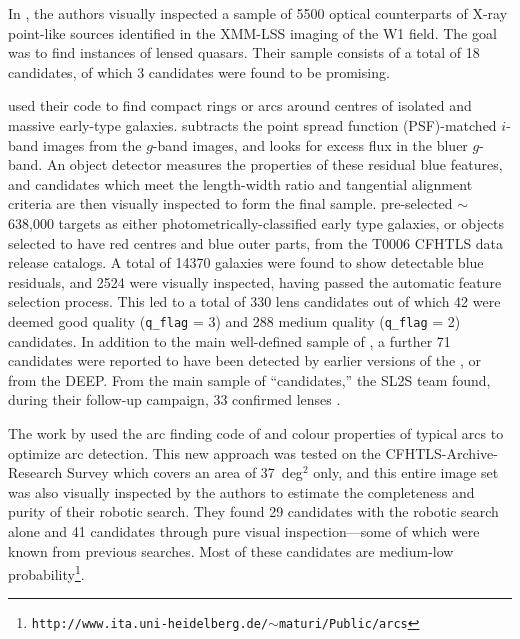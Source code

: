 \documentclass[useAMS,usenatbib,a4paper]{mn2e}
\begin{document}
In \citet{Elyiv2013}, the authors visually inspected a sample of 5500 optical
counterparts of X-ray point-like sources identified in the XMM-LSS
imaging of the \cfhtls W1 field. The goal was to find instances
of lensed quasars. Their sample consists of a total of 18 candidates,
of which 3 candidates were found to be promising.

\citet{Gavazzi2014} used their \rf code to find compact rings or arcs
around centres of isolated and massive early-type galaxies. \rf
subtracts the point spread function (PSF)-matched $i$-band images from the $g$-band images, and
looks for excess flux in the bluer $g$-band. An object detector measures
the properties of these residual blue features, and candidates which
meet the length-width ratio and tangential alignment criteria are then
visually inspected to form the final sample. \citet{Gavazzi2014}
pre-selected $\sim$638,000 targets as either photometrically-classified
early type galaxies, or objects selected to have red centres and blue
outer parts, from the T0006 CFHTLS data release catalogs. A total of
14370 galaxies were found to show detectable blue residuals, and 2524
were visually inspected, having passed the automatic feature selection
process. This led to a total of 330 lens candidates out of which 42 were deemed
good quality (\texttt{q\_flag} = 3) and 288  medium quality
(\texttt{q\_flag} = 2) candidates. In addition to the main well-defined
sample of \citet{Gavazzi2014}, a further 71 candidates were reported to
have been detected by earlier versions of the \rf, or from the \cfhtls DEEP.
From the main sample of ``\rf candidates,'' the SL2S team found, during
their follow-up campaign, 33 confirmed lenses \citep{Sonnenfeld2013a,Sonnenfeld2013b}.

The work by \citet{Maturi2014} used the arc finding code of
\citet{Seidel2007} and colour properties of typical arcs to optimize arc
detection. This new approach was tested on the CFHTLS-Archive-Research
Survey \citep[CARS,][]{Erben2009} which covers an area of 37~deg$^2$
only, and this entire image set was also visually inspected by the authors to
estimate the completeness and purity of their robotic search. They found 29
candidates with the robotic search alone and 41 candidates through pure
visual inspection---some of which were known from previous searches. Most
of these candidates are medium-low
probability\footnote{\texttt{http://www.ita.uni-heidelberg.de/$\sim$maturi/Public/arcs}}.
\end{document}
